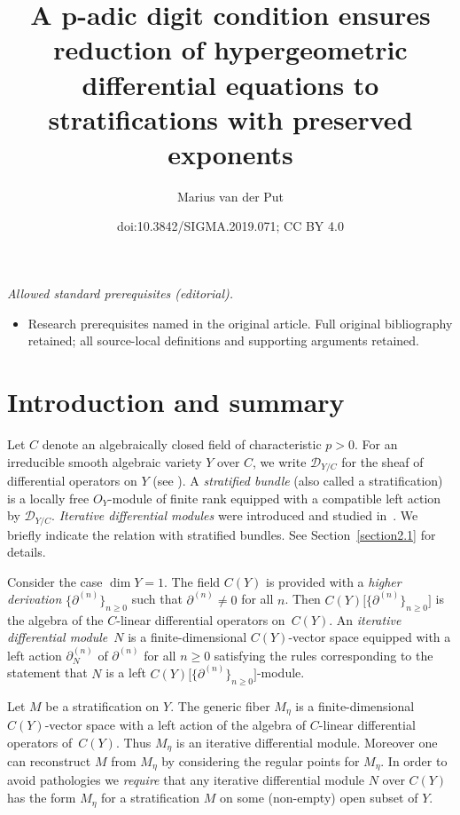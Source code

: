 \documentclass[10pt,a4paper]{amsart}
\title{A p-adic digit condition ensures reduction of hypergeometric differential equations to stratifications with preserved exponents}
\author{Marius van der Put}
\date{doi:10.3842/SIGMA.2019.071; CC BY 4.0}
\numberwithin{equation}{section}
\begin{document}
\maketitle
\noindent\textit{Allowed standard prerequisites (editorial).}\begin{itemize}
\item Research prerequisites named in the original article. Full original bibliography retained; all source-local definitions and supporting arguments retained.
\end{itemize}\medskip
\section{Introduction and summary}\label{section1}

Let $C$ denote an algebraically closed field of characteristic $p>0$. For an irreducible smooth algebraic variety $Y$ over $C$, we write $\mathcal{D}_{Y/C}$ for the sheaf of differential operators on $Y$ (see \cite[Section~16.8.1]{EGA4}). A {\it stratified bundle} (also called a stratification) is a locally free $O_Y$-module of finite rank equipped with a compatible left action by $\mathcal{D}_{Y/C}$. {\it Iterative differential modules} were introduced and studied in~\cite{Ma-vdP1}. We briefly indicate the relation with stratified bundles. See Section~\ref{section2.1} for details.

Consider the case $\dim Y=1$. The field $C(Y)$ is provided with a {\it higher derivation} $\big\{\partial^{(n)}\big\}_{n\geq 0}$ such that $\partial^{(n)}\neq 0$ for all $n$. Then $C(Y)\big[\big\{\partial^{(n)}\big\}_{n\geq 0}\big]$ is the algebra of the $C$-linear differential operators on~$C(Y)$. An {\it iterative differential module}~$N$ is a finite-dimensional $C(Y)$-vector space equipped with a left action $\partial_N^{(n)}$ of $\partial^{(n)}$ for all $n\geq 0$ satisfying the rules corresponding to the statement that $N$ is a left $C(Y)\big[\big\{\partial^{(n)}\big\}_{n\geq 0}\big]$-module.

 Let $M$ be a stratification on $Y$. The generic fiber $M_\eta$ is a finite-dimensional $C(Y)$-vector space with a left action of the algebra of $C$-linear differential operators of~$C(Y)$. Thus $M_\eta$ is an iterative differential module. Moreover one can reconstruct $M$ from $M_\eta$ by considering the regular points for $M_\eta$. In order to avoid pathologies we {\it require} that any iterative differential module $N$ over $C(Y)$ has the form $M_\eta$ for a stratification $M$ on some (non-empty) open subset of $Y$.
\end{document}
